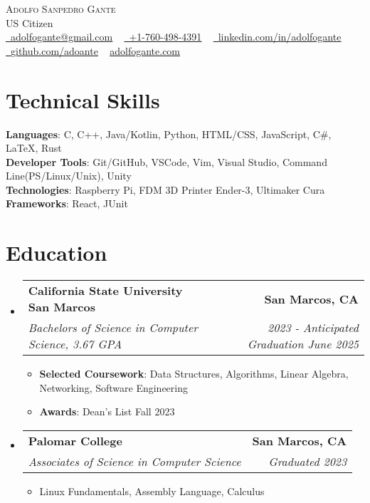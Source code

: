 \documentclass[letterpaper,11pt]{article}
\makeatletter
\newcommand{\resumeItem}[1]{
  \item\small{
    {#1 \vspace{-3pt}}
  }
}
\newcommand{\resumeSubheading}[4]{
  \vspace{-3pt}\item
    \begin{tabular*}{1.0\textwidth}[t]{l@{\extracolsep{\fill}}r}
      \textbf{#1} & \textbf{\small #2} \\
      \textit{\small#3} & \textit{\small #4} \\
    \end{tabular*}\vspace{-7pt}
}
\newcommand{\resumeSubHeadingListStart}{\begin{itemize}[leftmargin=0.0in, label={}]}
\newcommand{\resumeSubHeadingListEnd}{\end{itemize}}
\newcommand{\resumeItemListStart}{\begin{itemize}}
\newcommand{\resumeItemListEnd}{\end{itemize}\vspace{0pt}}
\makeatother
\begin{document}
    \begin{center}
        {\Huge\scshape Adolfo Sanpedro Gante} 
        \\ US Citizen \\
        \small
        \href{mailto:adolfogante@gmail.com}{\raisebox{-0.2\height}\faEnvelope\  \underline{adolfogante@gmail.com}} ~
        \href{tel:+17604984391}{\raisebox{-0.2\height}\faMobile\  \underline{+1-760-498-4391}} ~ 
        \href{https://www.linkedin.com/in/adolfogante/}{\raisebox{-0.2\height}\faLinkedin\ \underline{linkedin.com/in/adolfogante}}  ~
        \href{https://github.com/adoante}{\raisebox{-0.2\height}\faGithub\ \underline{github.com/adoante}} ~
        \href{https://adolfogante.com/}{\underline{adolfogante.com}}
    \end{center}

\section{Technical Skills}

    \vspace{-7pt}
    \begin{itemize}
    [leftmargin=0.15in, label={}]\small{\item{
        \textbf{Languages}{: C, C++, Java/Kotlin, Python, HTML/CSS, JavaScript, C\#, LaTeX, Rust} \\
        \textbf{Developer Tools}{: Git/GitHub, VSCode, Vim, Visual Studio, Command Line(PS/Linux/Unix), Unity} \\
        \textbf{Technologies}{: Raspberry Pi, FDM 3D Printer Ender-3,  Ultimaker Cura} \\
        \textbf{Frameworks}{: React, JUnit} \\
        }}
    \end{itemize}

    
\section{Education}
  \resumeSubHeadingListStart
  
    \resumeSubheading
    {California State University San Marcos}{San Marcos, CA}
    {Bachelors of Science in Computer Science, 3.67 GPA}{2023 - Anticipated Graduation June 2025}
      \resumeItemListStart
        \resumeItem{\textbf{Selected Coursework}: Data Structures, Algorithms, Linear Algebra, Networking, Software Engineering}
        \resumeItem{\textbf{Awards}: Dean's List Fall 2023}
      \resumeItemListEnd
    \resumeSubheading
    {Palomar College}{San Marcos, CA}
    {Associates of Science in Computer Science}{Graduated 2023}
      \resumeItemListStart
        \resumeItem{Linux Fundamentals, Assembly Language, Calculus}
      \resumeItemListEnd
  \resumeSubHeadingListEnd
\end{document}
